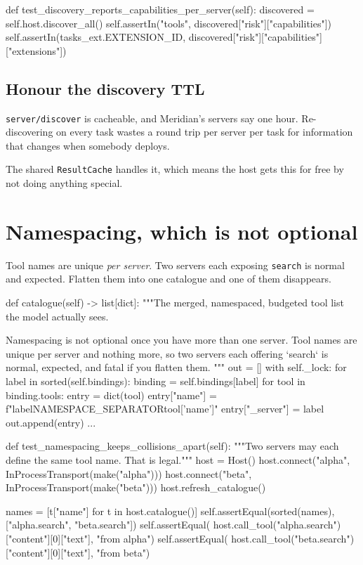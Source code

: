 \begin{py}
def test_discovery_reports_capabilities_per_server(self):
    discovered = self.host.discover_all()
    self.assertIn("tools", discovered["risk"]["capabilities"])
    self.assertIn(tasks_ext.EXTENSION_ID,
                  discovered["risk"]["capabilities"]["extensions"])
\end{py}

\subsection{Honour the discovery TTL}

\texttt{server/discover} is cacheable, and Meridian's servers say one hour.
Re-discovering on every task wastes a round trip per server per task for
information that changes when somebody deploys.

The shared \texttt{ResultCache} handles it, which means the host gets this for
free by not doing anything special.

\section{Namespacing, which is not optional}

Tool names are unique \emph{per server}. Two servers each exposing
\texttt{search} is normal and expected. Flatten them into one catalogue and one
of them disappears.

\begin{py}
def catalogue(self) -> list[dict]:
    """The merged, namespaced, budgeted tool list the model actually sees.

    Namespacing is not optional once you have more than one server. Tool
    names are unique per server and nothing more, so two servers each
    offering `search` is normal, expected, and fatal if you flatten them.
    """
    out = []
    with self._lock:
        for label in sorted(self.bindings):
            binding = self.bindings[label]
            for tool in binding.tools:
                entry = dict(tool)
                entry["name"] = f"{label}{NAMESPACE_SEPARATOR}{tool['name']}"
                entry["_server"] = label
                out.append(entry)
    ...
\end{py}

\begin{py}
def test_namespacing_keeps_collisions_apart(self):
    """Two servers may each define the same tool name. That is legal."""
    host = Host()
    host.connect("alpha", InProcessTransport(make("alpha")))
    host.connect("beta", InProcessTransport(make("beta")))
    host.refresh_catalogue()

    names = [t["name"] for t in host.catalogue()]
    self.assertEqual(sorted(names), ["alpha.search", "beta.search"])
    self.assertEqual(
        host.call_tool("alpha.search")["content"][0]["text"], "from alpha")
    self.assertEqual(
        host.call_tool("beta.search")["content"][0]["text"], "from beta")
\end{py}

